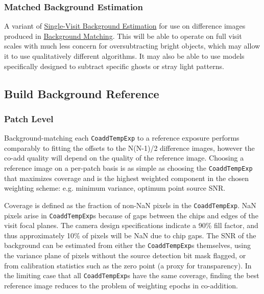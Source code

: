 \subsubsection{Matched Background Estimation}
\label{sec:acMatchedBackgroundEstimation}

A variant of \hyperref[sec:acSingleVisitBackgroundEstimation]{Single-Visit Background Estimation} for use on difference images produced in \hyperref[sec:drpBackgroundMatchAndReject]{Background Matching}.  This will be able to operate on full visit scales with much less concern for oversubtracting bright objects, which may allow it to use qualitatively different algorithms.  It may also be able to use models specifically designed to subtract specific ghosts or stray light patterns.

\subsection{Build Background Reference}
\label{sec:acBuildBackgroundReference}

\subsubsection{Patch Level}
Background-matching each \texttt{CoaddTempExp} to a reference exposure performs comparably to fitting
the offsets to the N(N-1)/2 difference images, however the co-add quality will depend on the quality of the
reference image.  Choosing a reference image on a per-patch basis is as simple as choosing the \texttt{CoaddTempExp} that
maximizes coverage and is the highest weighted component in the chosen weighting scheme: e.g. minimum variance, optimum point source SNR.

Coverage is defined as the fraction of non-NaN
pixels in the \texttt{CoaddTempExp}. NaN pixels arise in \texttt{CoaddTempExp}s because of gaps between the chips and edges of the visit focal
planes.  The camera design specifications indicate a 90\% fill factor, and thus approximately 10\% of pixels
will be NaN due to chip gaps.  The SNR of the background can be estimated from either the \texttt{CoaddTempExp}s themselves,
using the variance plane of pixels without the source detection bit mask flagged, or from calibration
statistics such as the zero point (a proxy for transparency).  In the limiting case that all \texttt{CoaddTempExp}s have the
same coverage, finding the best reference image reduces to the problem of weighting epochs in co-addition.

